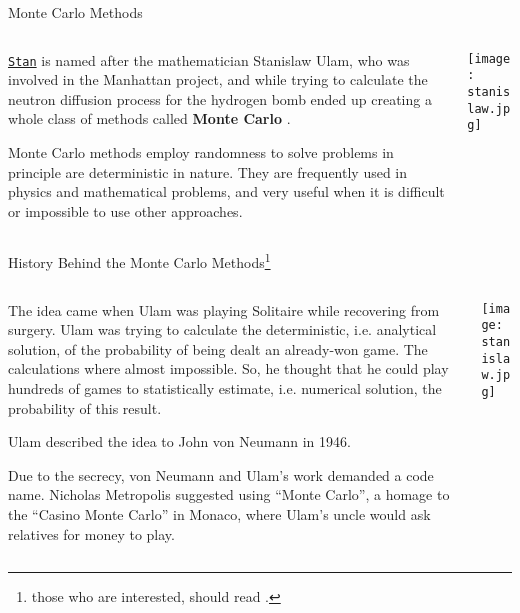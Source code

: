 \begin{frame}{Monte Carlo Methods}
	\begin{columns}
		\begin{column}{0.8\textwidth}
			\begin{vfilleditems}
				\item \href{http://mc-stan.org/}{\texttt{Stan}} is named after the mathematician Stanislaw Ulam,
				who was involved in the Manhattan project,
				and while trying to calculate the neutron diffusion process for the hydrogen bomb
				ended up creating a whole class of methods called \textbf{Monte Carlo} \parencite{eckhardtStanUlamJohn1987}.
				\item Monte Carlo methods employ randomness to solve problems in principle are deterministic in nature.
				They are frequently used in physics and mathematical problems,
				and very useful when it is difficult or impossible to use other approaches.
			\end{vfilleditems}
		\end{column}
		\begin{column}{0.2\textwidth}
			\centering
			\texttt{[image: stanislaw.jpg]}
		\end{column}
	\end{columns}
\end{frame}

\begin{frame}{History Behind the Monte Carlo Methods\footnote{those who are interested, should read \textcite{eckhardtStanUlamJohn1987}.}}
	\begin{columns}
		\begin{column}{0.8\textwidth}
			\begin{vfilleditems}
				\item The idea came when Ulam was playing Solitaire while recovering from surgery.
				Ulam was trying to calculate the deterministic, i.e. analytical solution,
				of the probability of being dealt an already-won game.
				The calculations where almost impossible.
				So, he thought that he could play hundreds of games to statistically estimate,
				i.e. numerical solution, the probability of this result.
				\item Ulam described the idea to John von Neumann in 1946.
				\item \small Due to the secrecy, von Neumann and Ulam's work demanded a code name.
				Nicholas Metropolis suggested using ``Monte Carlo'',
				a homage to the ``Casino Monte Carlo'' in Monaco,
				where Ulam's uncle would ask relatives for money to play.
			\end{vfilleditems}
		\end{column}
		\begin{column}{0.2\textwidth}
			\centering
			\texttt{[image: stanislaw.jpg]}
		\end{column}
	\end{columns}
\end{frame}

